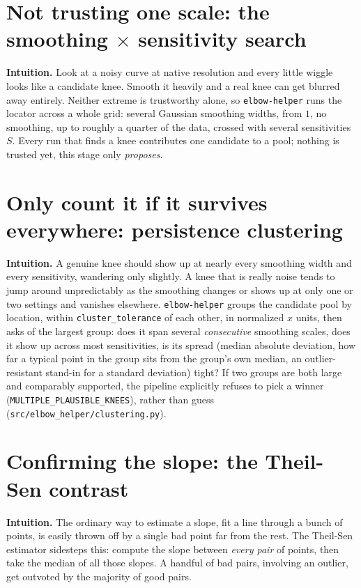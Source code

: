 \documentclass[11pt]{article}
\newcommand{\code}[1]{\texttt{#1}}
\begin{document}
\section{Not trusting one scale: the smoothing $\times$ sensitivity search}
\label{sec:multiscale}

\textbf{Intuition.} Look at a noisy curve at native resolution and every
little wiggle looks like a candidate knee. Smooth it heavily and a real
knee can get blurred away entirely. Neither extreme is trustworthy alone,
so \code{elbow-helper} runs the locator across a whole grid: several Gaussian
smoothing widths, from $1$, no smoothing, up to roughly a quarter of the
data, crossed with several sensitivities $S$. Every run that finds a knee
contributes one candidate to a pool; nothing is trusted yet, this stage
only \emph{proposes}.

\section{Only count it if it survives everywhere: persistence clustering}
\label{sec:persistence}

\textbf{Intuition.} A genuine knee should show up at nearly every smoothing
width and every sensitivity, wandering only slightly. A knee that is really
noise tends to jump around unpredictably as the smoothing changes or shows
up at only one or two settings and vanishes elsewhere. \code{elbow-helper}
groups the candidate pool by location, within \code{cluster\_tolerance} of
each other, in normalized $x$ units, then asks of the largest group: does
it span several \emph{consecutive} smoothing scales, does it show up
across most sensitivities, is its spread (median absolute deviation, how far a typical point in
the group sits from the group's own median, an outlier-resistant
stand-in for a standard deviation) tight? If two groups are both large and comparably supported, the pipeline
explicitly refuses to pick a winner (\code{MULTIPLE\_PLAUSIBLE\_KNEES}),
rather than guess (\code{src/elbow\_helper/\allowbreak clustering.py}).

\section{Confirming the slope: the Theil-Sen contrast}
\label{sec:theilsen}

\textbf{Intuition.} The ordinary way to estimate a slope, fit a line
through a bunch of points, is easily thrown off by a single bad point far
from the rest. The Theil-Sen estimator sidesteps this: compute the slope
between \emph{every pair} of points, then take the median of all those
slopes. A handful of bad pairs, involving an outlier, get outvoted by the
majority of good pairs.
\end{document}
